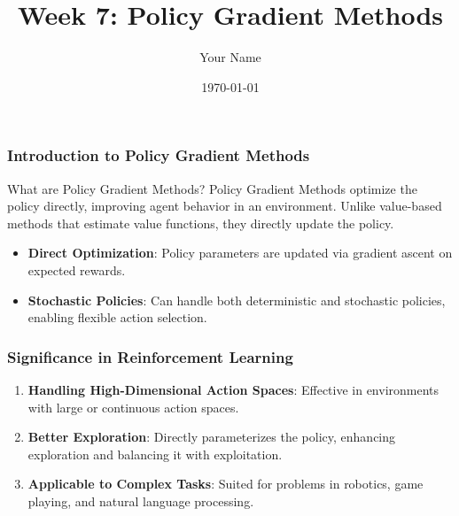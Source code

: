 \documentclass{beamer}
\title{Week 7: Policy Gradient Methods}
\author{Your Name}
\institute{Your Institution}
\date{\today}
\begin{document}
\frame{\titlepage}

\begin{frame}[fragile]
    \frametitle{Introduction to Policy Gradient Methods}
    
    \begin{block}{What are Policy Gradient Methods?}
        Policy Gradient Methods optimize the policy directly, improving agent behavior in an environment.
        Unlike value-based methods that estimate value functions, they directly update the policy.
    \end{block}
    
    \begin{itemize}
        \item \textbf{Direct Optimization}: Policy parameters are updated via gradient ascent on expected rewards.
        \item \textbf{Stochastic Policies}: Can handle both deterministic and stochastic policies, enabling flexible action selection.
    \end{itemize}
\end{frame}

\begin{frame}[fragile]
    \frametitle{Significance in Reinforcement Learning}

    \begin{enumerate}
        \item \textbf{Handling High-Dimensional Action Spaces}: Effective in environments with large or continuous action spaces.
        \item \textbf{Better Exploration}: Directly parameterizes the policy, enhancing exploration and balancing it with exploitation.
        \item \textbf{Applicable to Complex Tasks}: Suited for problems in robotics, game playing, and natural language processing.
    \end{enumerate}
\end{frame}
\end{document}
